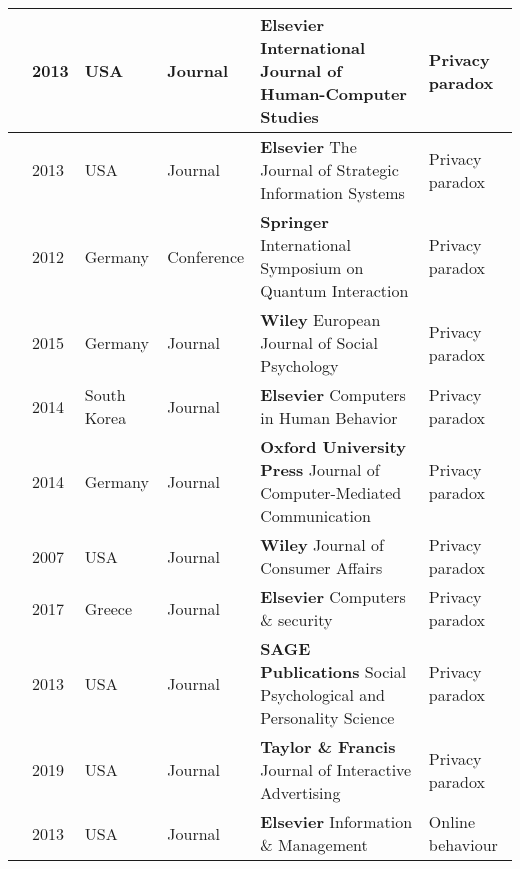 \begin{footnotesize}
\begin{longtable}{p{1.2cm} p{1cm} p{1.6cm} p{3.2cm} p{5cm} p{3cm}}
        \cite{knijnenburg2013dimensionality} & 2013 & USA & Journal & \textbf{Elsevier} International Journal of Human-Computer Studies & Privacy paradox \\
        \hline
        \cite{wakefield2013influence} & 2013 & USA & Journal & \textbf{Elsevier} The Journal of Strategic Information Systems & Privacy paradox \\
        \hline
        \cite{flender2012type} & 2012 & Germany & Conference & \textbf{Springer} International Symposium on Quantum Interaction & Privacy paradox \\
        \hline
        \cite{dienlin2015privacy} & 2015 & Germany & Journal & \textbf{Wiley} European Journal of Social Psychology & Privacy paradox \\
        \hline
        \cite{baek2014solving} & 2014 & South Korea & Journal & \textbf{Elsevier} Computers in Human Behavior & Privacy paradox \\
        \hline
        \cite{taddicken2014privacy} & 2014 & Germany & Journal & \textbf{Oxford University Press} Journal of Computer-Mediated Communication & Privacy paradox \\
        \hline
        \cite{norberg2007privacy} & 2007 & USA & Journal & \textbf{Wiley} Journal of Consumer Affairs & Privacy paradox \\
        \hline
        \cite{kokolakis2017privacy} & 2017 & Greece & Journal & \textbf{Elsevier} Computers \& security & Privacy paradox \\
        \hline
        \cite{brandimarte2013misplaced} & 2013 & USA & Journal & \textbf{SAGE Publications} Social Psychological and Personality Science & Privacy paradox \\
        \hline
        \cite{xie2019consumers} & 2019 & USA & Journal & \textbf{Taylor \& Francis} Journal of Interactive Advertising & Privacy paradox \\
        \hline
        \cite{SCHWAIG20131} & 2013 & USA & Journal & \textbf{Elsevier} Information \& Management & Online behaviour \\
        \hline

\end{longtable}
\end{footnotesize}
